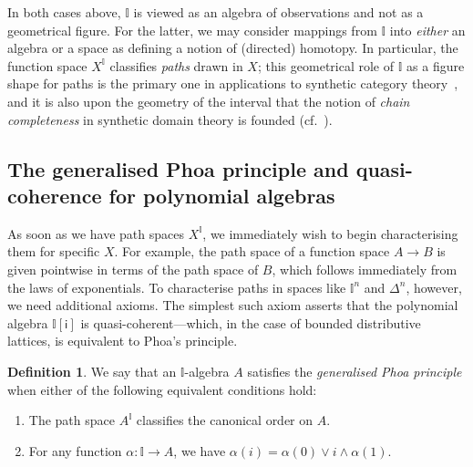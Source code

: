 \documentclass[a4paper,12pt]{amsart}
\theoremstyle{definition}
\newtheorem{definition}[theorem]{Definition}
\newcommand{\mbb}[1]{\mathbb{#1}}
\newcommand{\I}{\mbb I}
\newcommand{\ms}[1]{\mathsf{#1}}
\begin{document}
In both cases above, $\I$ is viewed as an algebra of observations and not as a geometrical figure. For the latter, we may consider mappings from $\I$ into \emph{either} an algebra or a space as defining a notion of (directed) homotopy. In particular, the function space $X^\I$ classifies \emph{paths} drawn in $X$; this geometrical role of $\I$ as a figure shape for paths is the primary one in applications to synthetic category theory~\citep{riehl2017type}, and it is also upon the geometry of the interval that the notion of \emph{chain completeness} in synthetic domain theory is founded (cf.\ ).

\subsection{The generalised Phoa principle and quasi-coherence for polynomial algebras}

As soon as we have path spaces $X^\I$, we immediately wish to begin characterising them for specific $X$. For example, the path space of a function space $A\to B$ is given pointwise in terms of the path space of $B$, which follows immediately from the laws of exponentials. To characterise paths in spaces like $\I^n$ and $\Delta^n$, however, we need additional axioms. The simplest such axiom asserts that the polynomial algebra $\I[\ms{i}]$ is quasi-coherent—which, in the case of bounded distributive lattices, is equivalent to Phoa's principle.

\begin{definition}\label{def:gen-phoa}
  We say that an $\I$-algebra $A$ satisfies the \emph{generalised Phoa principle} when either of the following equivalent conditions hold:
  \begin{enumerate}
    \item The path space $A^\I$ classifies the canonical order on $A$.
    \item For any function $\alpha\colon \I\to A$, we have $\alpha(i) = \alpha(0)\vee i \wedge \alpha(1)$.
  \end{enumerate}
\end{definition}
\end{document}
